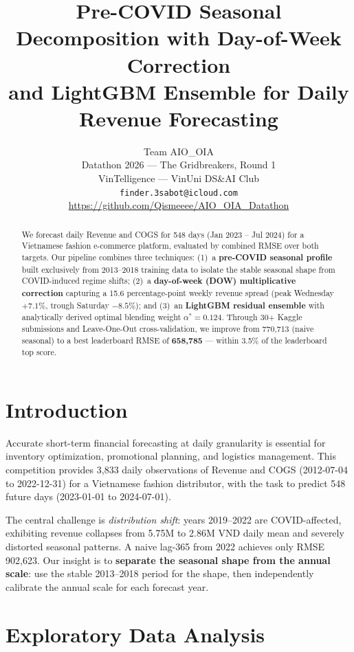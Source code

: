 \documentclass{article}
\title{Pre-COVID Seasonal Decomposition with Day-of-Week Correction\\
and LightGBM Ensemble for Daily Revenue Forecasting}
\author{%
  Team AIO\_OIA \\
  Datathon 2026 — The Gridbreakers, Round 1 \\
  VinTelligence — VinUni DS\&AI Club \\
  \texttt{finder.3sabot@icloud.com} \\
  \small\url{https://github.com/Qismeeee/AIO_OIA_Datathon}
}
\begin{document}
\maketitle

\begin{abstract}
We forecast daily Revenue and COGS for 548 days (Jan 2023 -- Jul 2024) for a Vietnamese fashion e-commerce platform, evaluated by combined RMSE over both targets.
Our pipeline combines three techniques: (1)~a \textbf{pre-COVID seasonal profile} built exclusively from 2013--2018 training data to isolate the stable seasonal shape from COVID-induced regime shifts; (2)~a \textbf{day-of-week (DOW) multiplicative correction} capturing a 15.6 percentage-point weekly revenue spread (peak Wednesday $+7.1\%$, trough Saturday $-8.5\%$); and (3)~an \textbf{LightGBM residual ensemble} with analytically derived optimal blending weight $\alpha^*=0.124$.
Through 30+ Kaggle submissions and Leave-One-Out cross-validation, we improve from 770{,}713 (naive seasonal) to a best leaderboard RMSE of \textbf{658{,}785} — within 3.5\% of the leaderboard top score.
\end{abstract}

\section{Introduction}

Accurate short-term financial forecasting at daily granularity is essential for inventory optimization, promotional planning, and logistics management.
This competition provides 3{,}833 daily observations of Revenue and COGS (2012-07-04 to 2022-12-31) for a Vietnamese fashion distributor, with the task to predict 548 future days (2023-01-01 to 2024-07-01).

The central challenge is \emph{distribution shift}: years 2019--2022 are COVID-affected, exhibiting revenue collapses from 5.75M to 2.86M VND daily mean and severely distorted seasonal patterns.
A naive lag-365 from 2022 achieves only RMSE 902{,}623.
Our insight is to \textbf{separate the seasonal shape from the annual scale}: use the stable 2013--2018 period for the shape, then independently calibrate the annual scale for each forecast year.

\section{Exploratory Data Analysis}
\end{document}
